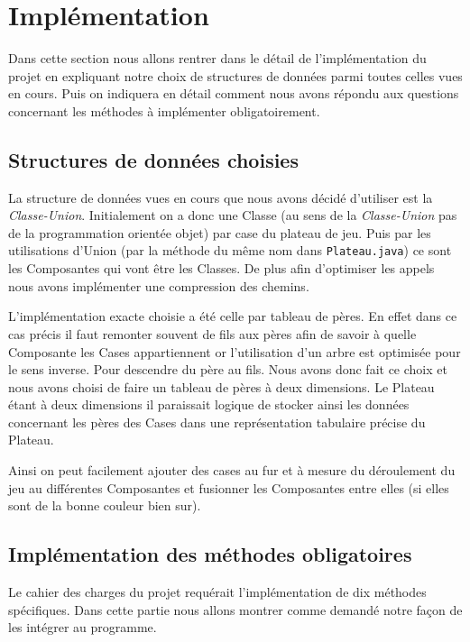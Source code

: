 \documentclass{article}
\newcommand{\info}{\texttt}
\begin{document}
\section{Implémentation}

    Dans cette section nous allons rentrer dans le détail de l'implémentation du projet en expliquant notre choix de structures de données parmi toutes celles vues en cours. Puis on indiquera en détail comment nous avons répondu aux questions concernant les méthodes à implémenter obligatoirement.

    \subsection{Structures de données choisies}

        La structure de données vues en cours que nous avons décidé d'utiliser est la \emph{Classe-Union}. Initialement on a donc une Classe (au sens de la \emph{Classe-Union} pas de la programmation orientée objet) par case du plateau de jeu. Puis par les utilisations d'Union (par la méthode du même nom dans \info{Plateau.java}) ce sont les Composantes qui vont être les Classes. De plus afin d'optimiser les appels nous avons implémenter une compression des chemins.
        
        L'implémentation exacte choisie a été celle par tableau de pères. En effet dans ce cas précis il faut remonter souvent de fils aux pères afin de savoir à quelle Composante les Cases appartiennent or l'utilisation d'un arbre est optimisée pour le sens inverse. Pour descendre du père au fils. Nous avons donc fait ce choix et nous avons choisi de faire un tableau de pères à deux dimensions. Le Plateau étant à deux dimensions il paraissait logique de stocker ainsi les données concernant les pères des Cases dans une représentation tabulaire précise du Plateau.
        
        Ainsi on peut facilement ajouter des cases au fur et à mesure du déroulement du jeu au différentes Composantes et fusionner les Composantes entre elles (si elles sont de la bonne couleur bien sur).

    \subsection{Implémentation des méthodes obligatoires}

        Le cahier des charges du projet requérait l'implémentation de dix méthodes spécifiques. Dans cette partie nous allons montrer comme demandé notre façon de les intégrer au programme.
        
\end{document}
